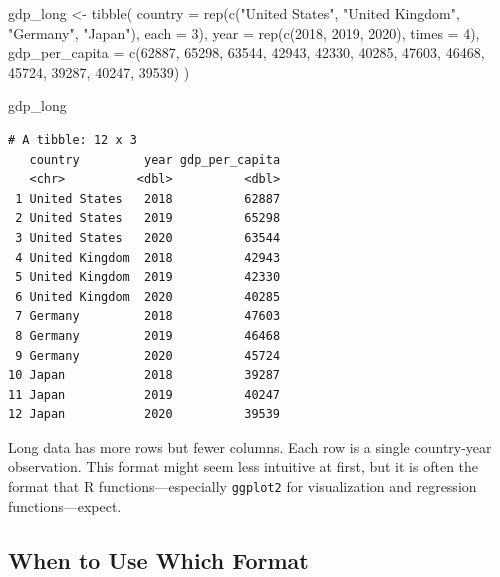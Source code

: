 \documentclass[
  letterpaper,
  DIV=11,
  numbers=noendperiod]{scrreprt}
\newenvironment{Shaded}{\begin{snugshade}}{\end{snugshade}}
\newcommand{\AttributeTok}[1]{\textcolor[rgb]{0.40,0.45,0.13}{#1}}
\newcommand{\DecValTok}[1]{\textcolor[rgb]{0.68,0.00,0.00}{#1}}
\newcommand{\FunctionTok}[1]{\textcolor[rgb]{0.28,0.35,0.67}{#1}}
\newcommand{\NormalTok}[1]{\textcolor[rgb]{0.00,0.23,0.31}{#1}}
\newcommand{\OtherTok}[1]{\textcolor[rgb]{0.00,0.23,0.31}{#1}}
\newcommand{\StringTok}[1]{\textcolor[rgb]{0.13,0.47,0.30}{#1}}
\begin{document}
\begin{Shaded}
\begin{Highlighting}[]
\NormalTok{gdp\_long }\OtherTok{\textless{}{-}} \FunctionTok{tibble}\NormalTok{(}
  \AttributeTok{country =} \FunctionTok{rep}\NormalTok{(}\FunctionTok{c}\NormalTok{(}\StringTok{"United States"}\NormalTok{, }\StringTok{"United Kingdom"}\NormalTok{, }\StringTok{"Germany"}\NormalTok{, }\StringTok{"Japan"}\NormalTok{), }\AttributeTok{each =} \DecValTok{3}\NormalTok{),}
  \AttributeTok{year =} \FunctionTok{rep}\NormalTok{(}\FunctionTok{c}\NormalTok{(}\DecValTok{2018}\NormalTok{, }\DecValTok{2019}\NormalTok{, }\DecValTok{2020}\NormalTok{), }\AttributeTok{times =} \DecValTok{4}\NormalTok{),}
  \AttributeTok{gdp\_per\_capita =} \FunctionTok{c}\NormalTok{(}\DecValTok{62887}\NormalTok{, }\DecValTok{65298}\NormalTok{, }\DecValTok{63544}\NormalTok{,}
                     \DecValTok{42943}\NormalTok{, }\DecValTok{42330}\NormalTok{, }\DecValTok{40285}\NormalTok{,}
                     \DecValTok{47603}\NormalTok{, }\DecValTok{46468}\NormalTok{, }\DecValTok{45724}\NormalTok{,}
                     \DecValTok{39287}\NormalTok{, }\DecValTok{40247}\NormalTok{, }\DecValTok{39539}\NormalTok{)}
\NormalTok{)}

\NormalTok{gdp\_long}
\end{Highlighting}
\end{Shaded}

\begin{verbatim}
# A tibble: 12 x 3
   country         year gdp_per_capita
   <chr>          <dbl>          <dbl>
 1 United States   2018          62887
 2 United States   2019          65298
 3 United States   2020          63544
 4 United Kingdom  2018          42943
 5 United Kingdom  2019          42330
 6 United Kingdom  2020          40285
 7 Germany         2018          47603
 8 Germany         2019          46468
 9 Germany         2020          45724
10 Japan           2018          39287
11 Japan           2019          40247
12 Japan           2020          39539
\end{verbatim}

Long data has more rows but fewer columns. Each row is a single
country-year observation. This format might seem less intuitive at
first, but it is often the format that R functions---especially
\texttt{ggplot2} for visualization and regression functions---expect.

\subsection{When to Use Which Format}\label{when-to-use-which-format}
\end{document}
